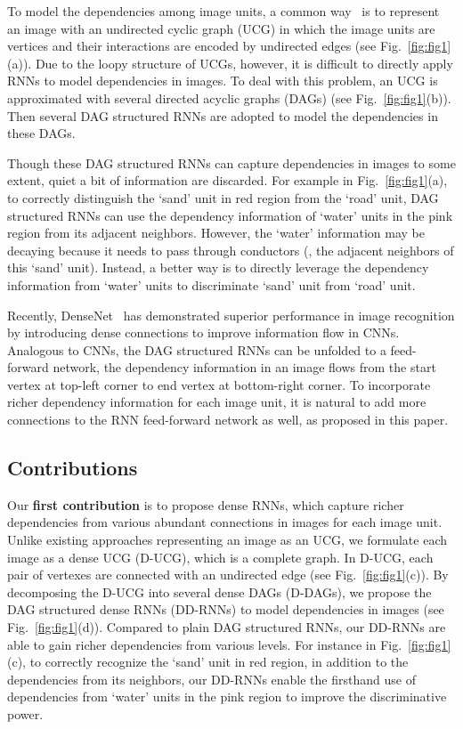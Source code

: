 \documentclass[10pt,twocolumn,letterpaper]{article}
\begin{document}
To model the dependencies among image units, a common way~\cite{shuai2017scene,zuo2016learning} is to represent an image with an undirected cyclic graph (UCG) in which the image units are vertices and their interactions are encoded by undirected edges (see Fig.~\ref{fig:fig1}(a)). Due to the loopy structure of UCGs, however, it is difficult to directly apply RNNs to model dependencies in images. To deal with this problem, an UCG is
approximated with several directed acyclic graphs (DAGs) (see Fig.~\ref{fig:fig1}(b)). Then several DAG structured RNNs are adopted to model the dependencies in these DAGs.

Though these DAG structured RNNs can capture dependencies in images to some extent, quiet a bit of information are discarded. For example in Fig.~\ref{fig:fig1}(a), to correctly distinguish the `sand' unit in red region from the `road' unit, DAG structured RNNs can use the dependency information of `water' units in the pink region from its adjacent neighbors. However, the `water' information may be decaying because it needs to pass through conductors (\ie, the adjacent neighbors of this `sand' unit). Instead, a better way is to directly leverage the dependency information from `water' units to discriminate `sand' unit from `road' unit.

Recently, DenseNet~\cite{huang2016densely} has demonstrated superior performance in image recognition by introducing dense connections to improve information flow in CNNs. Analogous to CNNs, the DAG structured RNNs can be unfolded to a feed-forward network, the dependency information in an image flows from the start vertex at top-left corner to end vertex at bottom-right corner. To incorporate richer dependency information for each image unit, it is natural to add more connections to the RNN feed-forward network as well, as proposed in this paper.

\subsection{Contributions}

Our {\bf first contribution} is to propose dense RNNs, which capture richer dependencies from various abundant connections in images for each image unit. Unlike existing approaches representing an image as an UCG, we formulate each image as a dense UCG (D-UCG), which is a complete graph. In D-UCG, each pair of vertexes are connected with an undirected edge (see Fig.~\ref{fig:fig1}(c)). By decomposing the D-UCG into several dense DAGs (D-DAGs), we propose the DAG structured dense RNNs (DD-RNNs) to model dependencies in images (see Fig.~\ref{fig:fig1}(d)). Compared to plain DAG structured RNNs, our DD-RNNs are able to gain richer dependencies from various levels. For instance in Fig.~\ref{fig:fig1}(c), to correctly recognize the `sand' unit in red region, in addition to the dependencies from its neighbors, our DD-RNNs enable the firsthand use of dependencies from `water' units in the pink region to improve the discriminative power.
\end{document}
